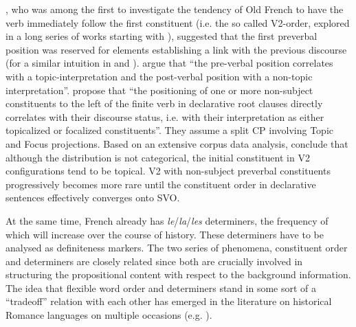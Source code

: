 \documentclass[output=paper,modfonts,nonflat]{langsci/langscibook}
\begin{document}
\citet{MarchelloNizia:1995}, who was among the first to investigate the tendency of Old French to have the verb immediately follow the first constituent (i.e. the so called V2-order, explored in a long series of works starting with \citealt{Skarup:1975}), suggested that the first preverbal position was reserved for elements establishing a link with the previous discourse (for a similar intuition in \citet{Vennemann:1974} and \citet{Harris:1978}). \citet[117]{RinkeMeisel:2009} argue that  ``the pre-verbal position correlates with a topic-interpretation and the post-verbal position with a non-topic interpretation''. \citet[24]{KaiserZimmermann:2011} propose that  ``the positioning of one or more non-subject constituents to the left of the finite verb in declarative root clauses directly correlates with their discourse status, i.e. with their interpretation as either topicalized or focalized constituents''. They assume a split CP involving Topic and Focus projections. Based on an extensive corpus data analysis, \citet{LabelleHirschbuhler:2018} conclude that although the distribution is not categorical, the initial constituent in V2 configurations tend to be topical. V2 with non-subject preverbal constituents progressively becomes more rare until the constituent order in declarative sentences effectively converges onto SVO.



At the same time, French already has {\itshape le}/{\itshape la}/{\itshape les} determiners, the frequency of which will increase over the course of history. These determiners have to be analysed as definiteness markers. The two series of phenomena, constituent order and determiners are closely related since both are crucially involved in structuring the propositional content with respect to the background information. The idea that flexible word order and determiners stand in some sort of a  ``tradeoff'' relation with each other has emerged in the literature on historical Romance languages on multiple occasions (e.g. \citet{Vincent:1997,Ledgeway:2012}).
\end{document}
